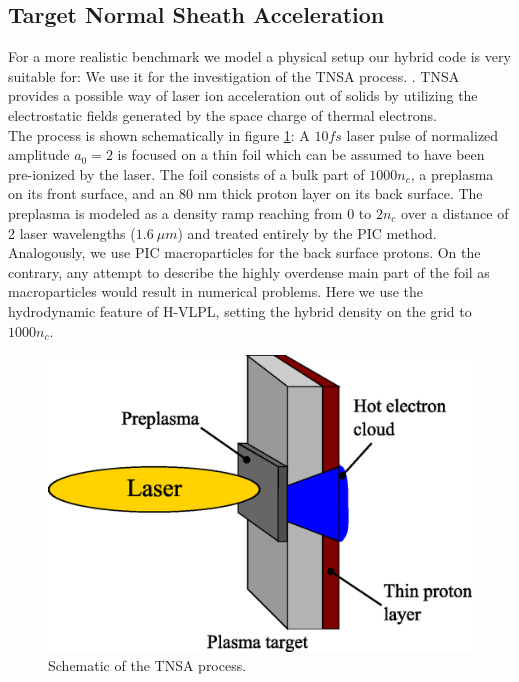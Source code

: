 \documentclass[conference]{IEEEtran}
\renewcommand{\~}{\widetilde }
\begin{document}
\subsection{Target Normal Sheath Acceleration}
For a more realistic benchmark we model a physical setup our hybrid code is very suitable for: We use it for the investigation of the TNSA process. \cite{TNSA}. TNSA provides a possible way of laser ion acceleration out of solids by utilizing the electrostatic fields generated by the space charge of thermal electrons. \\
The process is shown schematically in figure \ref{TNSA}: A $10 fs$
laser pulse of normalized amplitude $a_0 = 2$ is focused on a thin
foil which can be assumed to have been pre-ionized by the laser. The
foil consists of a bulk part of $1000 n_c$, a preplasma on its front
surface, and an 80 nm thick proton layer on its back surface. The
preplasma is modeled as a density ramp reaching from $0$ to $2 n_c$
over a distance of 2 laser wavelengths ($1.6~\mu m$) and treated entirely by the PIC method. Analogously, we use PIC macroparticles for the back surface protons. On the contrary, any attempt to describe the highly overdense main part of the foil as macroparticles would result in numerical problems. Here we use the hydrodynamic feature of H-VLPL, setting the hybrid density on the grid to $1000 n_c$. \\
\begin{figure}[h]
	\begin{center}
		\includegraphics[width=0.8\columnwidth]{TNSA.eps}
		\caption{Schematic of the TNSA process.}
		\label{TNSA}
	\end{center}
\end{figure}
\end{document}

